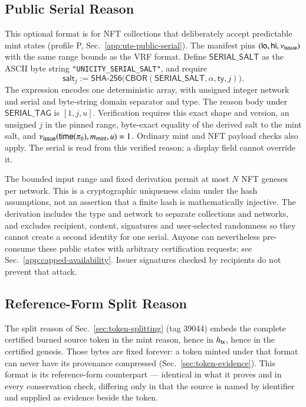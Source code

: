\subsection{Public Serial Reason}\label{app:reason-serial}

This optional format is for NFT collections that deliberately accept predictable mint states (profile P, Sec.~\ref{app:uts-public-serial}). The manifest pins $(\mathsf{lo},\mathsf{hi},\nu_\mathsf{issue})$ with the same range bounds as the VRF format. Define $\mathsf{SERIAL\_SALT}$ as the ASCII byte string \texttt{"UNICITY\_SERIAL\_SALT"}, and require
\[
\mathsf{salt}_j := \mathsf{SHA\text{-}256}\bigl(\mathsf{CBOR}(\mathsf{SERIAL\_SALT},\alpha,\mathsf{ty},j)\bigr).
\]
The expression encodes one deterministic array, with unsigned integer network and serial and byte-string domain separator and type. The reason body under $\mathsf{SERIAL\_TAG}$ is $[1,j,u]$. Verification requires this exact shape and version, an unsigned $j$ in the pinned range, byte-exact equality of the derived salt to the mint salt, and $\nu_\mathsf{issue}(\mathsf{time}(\pi_0),m_\mathsf{mint},u)=1$. Ordinary mint and NFT payload checks also apply. The serial is read from this verified reason; a display field cannot override it.

The bounded input range and fixed derivation permit at most $N$ NFT geneses per network. This is a cryptographic uniqueness claim under the hash assumptions, not an assertion that a finite hash is mathematically injective. The derivation includes the type and network to separate collections and networks, and excludes recipient, content, signatures and user-selected randomness so they cannot create a second identity for one serial. Anyone can nevertheless pre-consume these public states with arbitrary certification requests; see Sec.~\ref{app:capped-availability}. Issuer signatures checked by recipients do not prevent that attack.

\subsection{Reference-Form Split Reason}\label{app:reason-splitref}

The split reason of Sec.~\ref{sec:token-splitting} (tag 39044) embeds the complete certified burned source token in the mint reason, hence in ${h_\mathsf{tx}}$, hence in the certified genesis. Those bytes are fixed forever: a token minted under that format can never have its provenance compressed (Sec.~\ref{sec:token-evidence}). This format is its reference-form counterpart --- identical in what it proves and in every conservation check, differing only in that the source is named by identifier and supplied as evidence beside the token.

